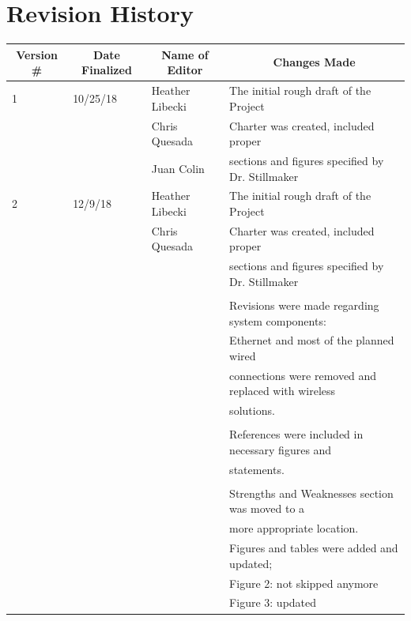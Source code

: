  \section*{Revision History}
\begin{table} [H]	
	\normalsize
	\centering
	\begin{tabular}{|l|l|l|l|}
		\hline
		\multicolumn{1}{|c|}{\textbf{Version \#}} & 
		\multicolumn{1}{|c|}{\textbf{Date Finalized}} &
		\multicolumn{1}{|c|}{\textbf{Name of Editor}} & 
		\multicolumn{1}{|c|}{\textbf{Changes Made}} \\
		\hline
		1 & 10/25/18 & Heather Libecki & The initial rough draft of the Project \\ 
		  &			 & Chris Quesada   & Charter was created, included proper \\ 
		  &			 & Juan Colin      & sections and figures specified by Dr. Stillmaker\\
		\hline
	    2 & 12/9/18 & Heather Libecki  & The initial rough draft of the Project \\ 
	      &			 & Chris Quesada   & Charter was created, included proper \\ 
	      &			 &                 & sections and figures specified by Dr. Stillmaker\\
	      &			 &				   &	\\
	      &			 &				   & Revisions were made regarding system components:\\ 
	      &			 &				   & Ethernet and most of the planned wired \\
	      &			 &				   & connections were removed and replaced with wireless\\ 
	      &			 &				   & solutions. \\
	      &			 &				   &	\\
	      &			 &				   & References were included in necessary figures and \\
	      &			 &				   &  statements. \\
	      &			 &				   &	\\
	      &			 &				   & Strengths and Weaknesses section was moved to a \\
	      &			 &				   & more appropriate location.\\
	      &			 &				   & Figures and tables were added and updated;\\
	      &			 &				   & Figure 2: not skipped anymore\\
	      &          &                 & Figure 3: updated\\

\end{tabular}
\end{table}
